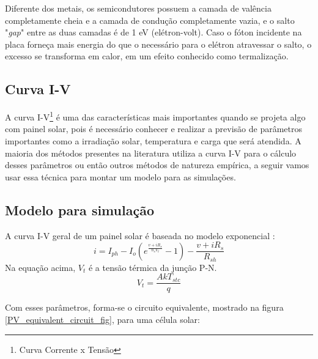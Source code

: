 Diferente dos metais, os semicondutores possuem a camada de valência completamente cheia e a camada de condução completamente vazia, e o salto "\textit{gap}" entre as duas camadas é de 1 eV (elétron-volt). Caso o fóton incidente na placa forneça mais energia do que o necessário para o elétron atravessar o salto, o excesso se transforma em calor, em um efeito conhecido como termalização.

\subsection*{Curva I-V}
A curva I-V\footnote{Curva Corrente x Tensão} é uma das características mais importantes quando se projeta algo com painel solar, pois é necessário conhecer e realizar a previsão de parâmetros importantes como a irradiação solar, temperatura e carga que será atendida. A maioria dos métodos presentes na literatura utiliza a curva I-V para o cálculo desses parâmetros ou então outros métodos de natureza empírica, a seguir vamos usar essa técnica\cite{pv_datasheet} para montar um modelo para as simulações.

\subsection*{Modelo para simulação}
A curva I-V geral de um painel solar é baseada no modelo exponencial \cite{pv_datasheet}:
\begin{equation}
    i = I_{ph} - I_{o}(e^{\frac{v + iR_{s}}{n_{s}V_{t}}}-1) - \frac{v + iR_{s}}{R_{sh}}
\end{equation}
Na equação acima, $V_{t}$ é a tensão térmica da junção P-N.
\begin{equation}
    V_{t} = \frac{AkT_{stc}}{q}
\end{equation}

Com esses parâmetros, forma-se o circuito equivalente, mostrado na figura \ref{PV_equivalent_circuit_fig}, para uma célula solar:

\noindent
\begin{minipage}{\linewidth}
\label{PV_equivalent_circuit_fig}
\end{minipage}



